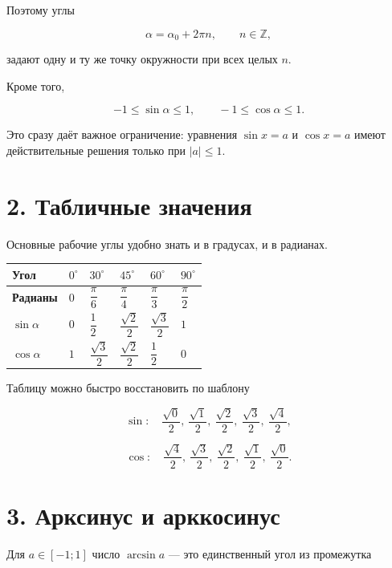 \documentclass[a4paper,12pt]{article}
\newcommand{\Z}{\mathbb{Z}}
\begin{document}
Поэтому углы

\[
\alpha=\alpha_0+2\pi n,
\qquad n\in\Z,
\]

задают одну и ту же точку окружности при всех целых \(n\).

Кроме того,

\[
-1\le \sin\alpha\le 1,
\qquad
-1\le \cos\alpha\le 1.
\]

Это сразу даёт важное ограничение: уравнения \(\sin x=a\) и \(\cos x=a\) имеют действительные решения только при \(|a|\le1\).

\section{2. Табличные значения}

Основные рабочие углы удобно знать и в градусах, и в радианах.

\begin{center}
\begin{tabularx}{0.98\linewidth}{
  >{\centering\arraybackslash}X
  >{\centering\arraybackslash}X
  >{\centering\arraybackslash}X
  >{\centering\arraybackslash}X
  >{\centering\arraybackslash}X
  >{\centering\arraybackslash}X
}
\toprule
\textbf{Угол} & \(0^\circ\) & \(30^\circ\) & \(45^\circ\) & \(60^\circ\) & \(90^\circ\) \\
\midrule
\textbf{Радианы} & \(0\) & \(\dfrac{\pi}{6}\) & \(\dfrac{\pi}{4}\) & \(\dfrac{\pi}{3}\) & \(\dfrac{\pi}{2}\) \\[1mm]
\(\sin\alpha\) & \(0\) & \(\dfrac12\) & \(\dfrac{\sqrt2}{2}\) & \(\dfrac{\sqrt3}{2}\) & \(1\) \\[2mm]
\(\cos\alpha\) & \(1\) & \(\dfrac{\sqrt3}{2}\) & \(\dfrac{\sqrt2}{2}\) & \(\dfrac12\) & \(0\) \\
\bottomrule
\end{tabularx}
\end{center}

Таблицу можно быстро восстановить по шаблону

\[
\sin:\quad
\frac{\sqrt0}{2},\
\frac{\sqrt1}{2},\
\frac{\sqrt2}{2},\
\frac{\sqrt3}{2},\
\frac{\sqrt4}{2},
\]

\[
\cos:\quad
\frac{\sqrt4}{2},\
\frac{\sqrt3}{2},\
\frac{\sqrt2}{2},\
\frac{\sqrt1}{2},\
\frac{\sqrt0}{2}.
\]

\section{3. Арксинус и арккосинус}

Для \(a\in[-1;1]\) число \(\arcsin a\) --- это единственный угол из промежутка
\end{document}
